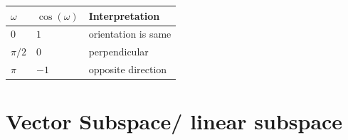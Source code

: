 \begin{customArrayStretch}{1.3}
\begin{table}[H]
    \centering
    \begin{tabular}{|l|l|l|}
        \hline
        $\omega$ & $\cos(\omega)$ & Interpretation \\
        \hline
        $0$ & $1$ & orientation is same \\
        ${\pi}/{2}$ & $0$ & perpendicular \\
        $\pi$ & $-1$ & opposite direction \\
        \hline
    \end{tabular}
\end{table}
\end{customArrayStretch}




















\section{Vector Subspace/ linear subspace}


